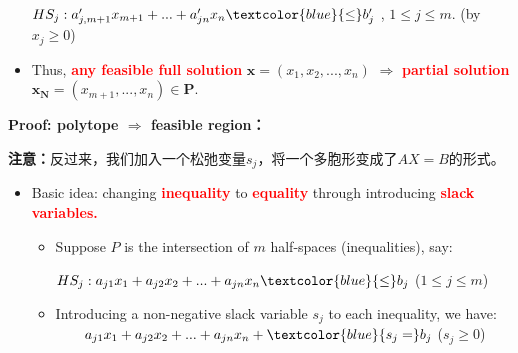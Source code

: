 \begin{itemize}
$HS_j: a_{j,m+1}'x_{m+1} + ... + a_{jn}'x_n \textcolor{blue}{\bf \leq } b_j' $ , $1\leq j \leq m$. (by $x_j \geq 0$)

\item
Thus,  \textcolor{red}{\bf any feasible full solution }  $\mathbf{x} = (x_1, x_2, ..., x_n)$   $\Rightarrow$ \textcolor{red}{\bf partial  solution  } $ \mathbf{{x}_{N}}=(x_{m+1}, ..., x_n)\in \mathbf{P}$.
\end{itemize}

\textbf{Proof: polytope $\Rightarrow$  feasible region：}

\textbf{注意：}反过来，我们加入一个松弛变量$s_j$，将一个多胞形变成了$AX=B$的形式。

\begin{itemize}
\item
Basic idea:  changing \textcolor{red}{\bf inequality} to \textcolor{red}{\bf equality} through introducing \textcolor{red}{\bf slack variables.}  \\

\begin{itemize}
 \item

Suppose $P$ is the intersection of $m$ half-spaces (inequalities), say:

$HS_j: a_{j1}x_1 + a_{j2}x_2 + ... + a_{jn}x_n \textcolor{blue}{ \leq } b_j $ ($1\leq j \leq m$)\\
\item Introducing a non-negative slack variable $s_j$ to each inequality, we have:\\
$\ \ \ \ \ \ a_{j1}x_1 + a_{j2}x_2 + ... + a_{jn}x_n +\textcolor{blue}{ s_j  = } b_j $ ($s_j \geq 0$)  \\

\end{itemize}
\end{itemize}

